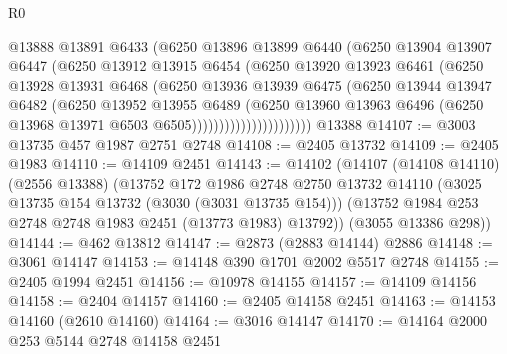 \begin{lexlean}{R0}
\begin{coremodule}
                            @13888
                            @13891
                            @6433
                            (@6250
                              @13896
                              @13899
                              @6440
                              (@6250
                                @13904
                                @13907
                                @6447
                                (@6250
                                  @13912
                                  @13915
                                  @6454
                                  (@6250
                                    @13920
                                    @13923
                                    @6461
                                    (@6250
                                      @13928
                                      @13931
                                      @6468
                                      (@6250
                                        @13936
                                        @13939
                                        @6475
                                        (@6250
                                          @13944
                                          @13947
                                          @6482
                                          (@6250
                                            @13952
                                            @13955
                                            @6489
                                            (@6250
                                              @13960
                                              @13963
                                              @6496
                                              (@6250 @13968 @13971 @6503 @6505))))))))))))))))))))))
    @13388
@14107 := @3003 @13735 @457 @1987 @2751 @2748
@14108 := @2405 @13732
@14109 := @2405 @1983
@14110 := @14109 @2451
@14143 := @14102
    (@14107
      (@14108 @14110)
      (@2556 @13388)
      (@13752
        @172
        @1986
        @2748
        @2750
        @13732
        @14110
        (@3025 @13735 @154 @13732 (@3030 (@3031 @13735 @154)))
        (@13752 @1984 @253 @2748 @2748 @1983 @2451 (@13773 @1983) @13792))
      (@3055 @13386 @298))
@14144 := @462 @13812
@14147 := @2873 (@2883 @14144) @2886
@14148 := @3061 @14147
@14153 := @14148 @390 @1701 @2002 @5517 @2748
@14155 := @2405 @1994 @2451
@14156 := @10978 @14155
@14157 := @14109 @14156
@14158 := @2404 @14157
@14160 := @2405 @14158 @2451
@14163 := @14153 @14160 (@2610 @14160)
@14164 := @3016 @14147
@14170 := @14164 @2000 @253 @5144 @2748 @14158 @2451

\end{coremodule}
\end{lexlean}
